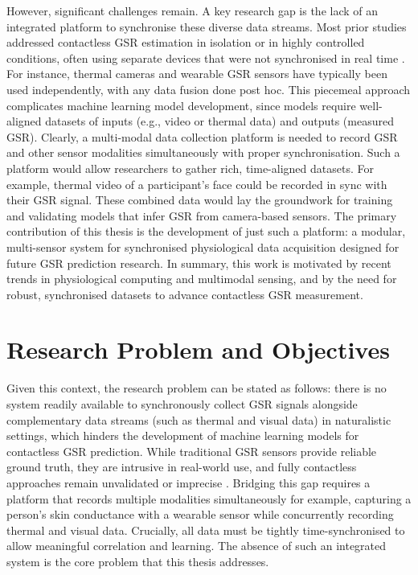 However, significant challenges remain. A key research gap is the lack of an integrated platform to synchronise these diverse data streams. Most prior studies addressed contactless GSR estimation in isolation or in highly controlled conditions, often using separate devices that were not synchronised in real time \cite{ref7}. For instance, thermal cameras and wearable GSR sensors have typically been used independently, with any data fusion done post hoc. This piecemeal approach complicates machine learning model development, since models require well-aligned datasets of inputs (e.g., video or thermal data) and outputs (measured GSR). Clearly, a multi-modal data collection platform is needed to record GSR and other sensor modalities simultaneously with proper synchronisation. Such a platform would allow researchers to gather rich, time-aligned datasets. For example, thermal video of a participant's face could be recorded in sync with their GSR signal. These combined data would lay the groundwork for training and validating models that infer GSR from camera-based sensors. The primary contribution of this thesis is the development of just such a platform: a modular, multi-sensor system for synchronised physiological data acquisition designed for future GSR prediction research. In summary, this work is motivated by recent trends in physiological computing and multimodal sensing, and by the need for robust, synchronised datasets to advance contactless GSR measurement.


\section{Research Problem and Objectives}
Given this context, the research problem can be stated as follows: there is no system readily available to synchronously collect GSR signals alongside complementary data streams (such as thermal and visual data) in naturalistic settings, which hinders the development of machine learning models for contactless GSR prediction. While traditional GSR sensors provide reliable ground truth, they are intrusive in real-world use, and fully contactless approaches remain unvalidated or imprecise \cite{ref8}. Bridging this gap requires a platform that records multiple modalities simultaneously \textemdash for example, capturing a person's skin conductance with a wearable sensor while concurrently recording thermal and visual data. Crucially, all data must be tightly time-synchronised to allow meaningful correlation and learning. The absence of such an integrated system is the core problem that this thesis addresses.

